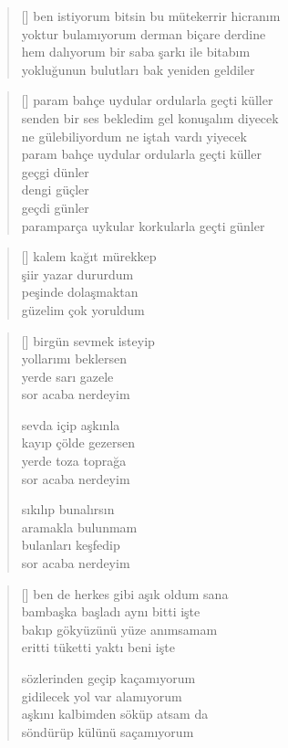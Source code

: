 \documentclass[a5paper, openright, twoside]{memoir}
\begin{document}
\begin{verse}[\versewidth]
  ben istiyorum bitsin bu mütekerrir hicranım \\
  yoktur bulamıyorum derman biçare derdine \\
  hem dalıyorum bir saba şarkı ile bitabım \\
  yokluğunun bulutları bak yeniden geldiler
\end{verse}
\begin{verse}[\versewidth]
  param bahçe uydular ordularla geçti küller \\
  senden bir ses bekledim gel konuşalım diyecek \\
  ne gülebiliyordum ne iştah vardı yiyecek \\
  param bahçe uydular ordularla geçti küller \\
  geçgi dünler \\
  dengi güçler \\
  geçdi günler \\
  paramparça uykular korkularla geçti günler
\end{verse}
\begin{verse}[\versewidth]
  kalem kağıt mürekkep \\
  şiir yazar dururdum \\
  peşinde dolaşmaktan \\
  güzelim çok yoruldum
\end{verse}
\begin{verse}[\versewidth]
  birgün sevmek isteyip \\
  yollarımı beklersen \\
  yerde sarı gazele \\
  sor acaba nerdeyim

  sevda içip aşkınla \\
  kayıp çölde gezersen \\
  yerde toza toprağa \\
  sor acaba nerdeyim

  sıkılıp bunalırsın \\
  aramakla bulunmam \\
  bulanları keşfedip \\
  sor acaba nerdeyim
\end{verse}
\begin{verse}[\versewidth]
  ben de herkes gibi aşık oldum sana \\
  bambaşka başladı aynı bitti işte \\
  bakıp gökyüzünü yüze anımsamam \\
  eritti tüketti yaktı beni işte

  sözlerinden geçip kaçamıyorum \\
  gidilecek yol var alamıyorum \\
  aşkını kalbimden söküp atsam da \\
  söndürüp külünü saçamıyorum
\end{verse}
\end{document}
